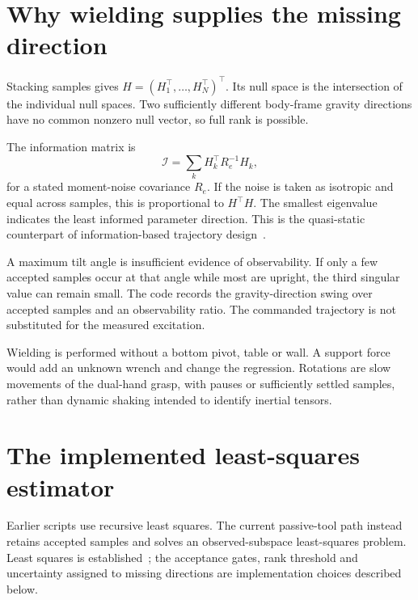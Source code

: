 
\section{Why wielding supplies the missing direction}

Stacking samples gives $H=(H_1^\top,\ldots,H_N^\top)^\top$. Its null space is the intersection of the individual null spaces. Two sufficiently different body-frame gravity directions have no common nonzero null vector, so full rank is possible.

The information matrix is
\begin{equation}
\mathcal I=\sum_k H_k^\top R_e^{-1}H_k,
\label{eq:information}
\end{equation}
for a stated moment-noise covariance $R_e$. If the noise is taken as isotropic and equal across samples, this is proportional to $H^\top H$. The smallest eigenvalue indicates the least informed parameter direction. This is the quasi-static counterpart of information-based trajectory design~\cite{wilson2014}.

A maximum tilt angle is insufficient evidence of observability. If only a few accepted samples occur at that angle while most are upright, the third singular value can remain small. The code records the gravity-direction swing over accepted samples and an observability ratio. The commanded trajectory is not substituted for the measured excitation.

Wielding is performed without a bottom pivot, table or wall. A support force would add an unknown wrench and change the regression. Rotations are slow movements of the dual-hand grasp, with pauses or sufficiently settled samples, rather than dynamic shaking intended to identify inertial tensors.

\section{The implemented least-squares estimator}

Earlier scripts use recursive least squares. The current passive-tool path instead retains accepted samples and solves an observed-subspace least-squares problem. Least squares is established~\cite[Section 3.1]{bishop2006}; the acceptance gates, rank threshold and uncertainty assigned to missing directions are implementation choices described below.

